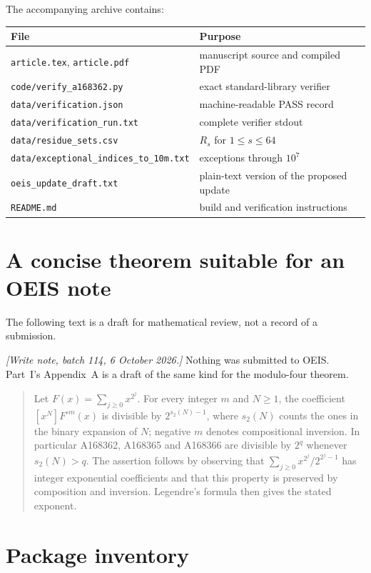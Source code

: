 \documentclass[11pt]{article}
\theoremstyle{definition}
\theoremstyle{remark}
\begin{document}
The accompanying archive contains:
\begin{center}
\begin{tabular}{ll}
\toprule
File & Purpose\\
\midrule
\texttt{article.tex}, \texttt{article.pdf} & manuscript source and compiled PDF\\
\texttt{code/verify\_a168362.py} & exact standard-library verifier\\
\texttt{data/verification.json} & machine-readable PASS record\\
\texttt{data/verification\_run.txt} & complete verifier stdout\\
\texttt{data/residue\_sets.csv} & $R_s$ for $1\le s\le64$\\
\texttt{data/exceptional\_indices\_to\_10m.txt} & exceptions through $10^7$\\
\texttt{oeis\_update\_draft.txt} & plain-text version of the proposed update\\
\texttt{README.md} & build and verification instructions\\
\bottomrule
\end{tabular}
\end{center}

\section{A concise theorem suitable for an OEIS note}
\label{lim:dsd:app:oeis-note}

The following text is a draft for mathematical review, not a
record of a submission.

\emph{[Write note, batch 114, 6 October 2026.]} Nothing was submitted to OEIS. Part~I's
Appendix~A is a draft of the same kind for the modulo-four theorem.

\begin{quote}
Let $F(x)=\sum_{j\ge0}x^{2^j}$. For every integer $m$ and
$N\ge1$, the coefficient $[x^N]F^{\circ m}(x)$ is divisible by
$2^{s_2(N)-1}$, where $s_2(N)$ counts the ones in the binary
expansion of $N$; negative $m$ denotes compositional inversion.
In particular A168362, A168365 and A168366 are divisible by
$2^q$ whenever $s_2(N)>q$. The assertion follows by observing
that $\sum_{j\ge0}x^{2^j}/2^{2^j-1}$ has integer exponential
coefficients and that this property is preserved by composition
and inversion. Legendre's formula then gives the stated exponent.
\end{quote}

\section{Package inventory}
\label{lim:dsd:app:inventory}
\end{document}
